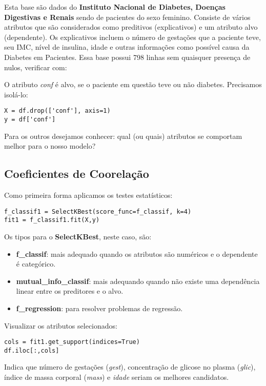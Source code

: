 Esta base são dados do \textbf{Instituto Nacional de Diabetes, Doenças Digestivas e Renais} sendo de pacientes do sexo feminino. Consiste de vários atributos que são considerados como preditivos (explicativos) e um atributo alvo (dependente). Os explicativos incluem o número de gestações que a paciente teve, seu IMC, nível de insulina, idade e outras informações como possível causa da Diabetes em Pacientes. Essa base possui 798 linhas sem quaisquer presença de nulos, verificar com:

O atributo \textit{conf} é alvo, se o paciente em questão teve ou não diabetes. Precisamos isolá-lo:
\begin{lstlisting}[]
X = df.drop(['conf'], axis=1)
y = df['conf']
\end{lstlisting}

Para os outros desejamos conhecer: qual (ou quais) atributos se comportam melhor para o nosso modelo?

\subsection{Coeficientes de Coorelação}
Como primeira forma aplicamos os testes estatísticos:
\begin{lstlisting}[]
f_classif1 = SelectKBest(score_func=f_classif, k=4)
fit1 = f_classif1.fit(X,y)
\end{lstlisting}

Os tipos para o \textbf{SelectKBest}, neste caso, são: \vspace{-1em}
\begin{itemize}
	\item \textbf{f\_classif}: mais adequado quando os atributos são numéricos e o dependente é categórico.
	\item \textbf{mutual\_info\_classif}: mais adequando quando não existe uma dependência linear entre os preditores e o alvo.
	\item \textbf{f\_regression}: para resolver problemas de regressão.
\end{itemize}

Visualizar os atributos selecionados:
\begin{lstlisting}[]
cols = fit1.get_support(indices=True)
df.iloc[:,cols]
\end{lstlisting}

Indica que número de gestações (\textit{gest}), concentração de glicose no plasma (\textit{glic}), índice de massa corporal (\textit{mass}) e \textit{idade} seriam os melhores candidatos.

